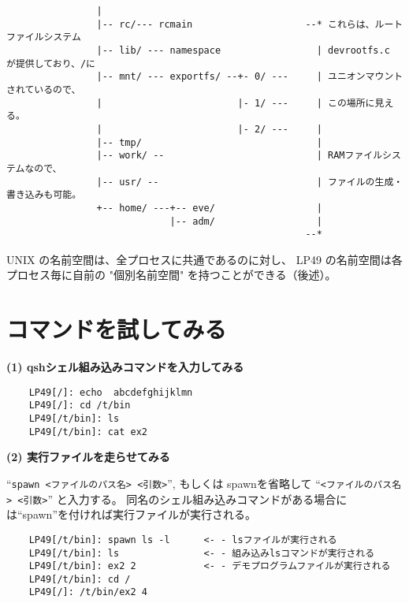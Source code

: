 {\begin{verbatim}
                |                                                 
                |-- rc/--- rcmain                    --* これらは、ルートファイルシステム
                |-- lib/ --- namespace                 | devrootfs.c が提供しており、/に
                |-- mnt/ --- exportfs/ --+- 0/ ---     | ユニオンマウントされているので、
                |                        |- 1/ ---     | この場所に見える。
                |                        |- 2/ ---     |            
                |-- tmp/                               |                     
                |-- work/ --                           | RAMファイルシステムなので、
                |-- usr/ --                            | ファイルの生成・書き込みも可能。
                +-- home/ ---+-- eve/                  |                                
                             |-- adm/                  |
                                                     --*

\end{verbatim}    
}

   UNIX の名前空間は、全プロセスに共通であるのに対し、
   LP49 の名前空間は各プロセス毎に自前の "個別名前空間" を持つことができる（後述）。  



\section{コマンドを試してみる}

{\bf (1) qshシェル組み込みコマンドを入力してみる}

\begin{verbatim}
    LP49[/]: echo  abcdefghijklmn
    LP49[/]: cd /t/bin
    LP49[/t/bin]: ls
    LP49[/t/bin]: cat ex2
\end{verbatim}


{\bf (2) 実行ファイルを走らせてみる}

    ``\verb|spawn <ファイルのパス名> <引数>|'', もしくは spawnを省略して
    ``\verb|<ファイルのパス名> <引数>|'' と入力する。
    同名のシェル組み込みコマンドがある場合には``spawn''を付ければ実行ファイルが実行される。

\begin{verbatim}
    LP49[/t/bin]: spawn ls -l      <- - lsファイルが実行される
    LP49[/t/bin]: ls               <- - 組み込みlsコマンドが実行される
    LP49[/t/bin]: ex2 2            <- - デモプログラムファイルが実行される
    LP49[/t/bin]: cd /
    LP49[/]: /t/bin/ex2 4
\end{verbatim}


